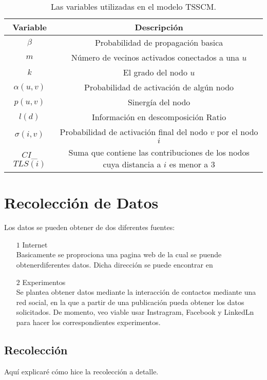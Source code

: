 \documentclass{article}
\begin{document}
\begin{table}[h]
	\begin{center}
		\begin{tabular}{| c | c |}
			\hline
			\textbf{Variable} & \textbf{Descripción} \\ 
			\hline
			$\beta$ & Probabilidad de propagación basica \\
			$m$ & Número de vecinos activados conectados a una $u$\\
			$k$ & El grado del nodo $u$\\
			$\alpha(u,v)$ & Probabilidad de activación de algún nodo\\
			$p(u,v)$ & Sinergía del nodo\\
			$l(d)$ & Información en descomposición Ratio\\
			$\sigma(i,v)$ & Probabilidad de activación final del nodo $v$ por el nodo $i$ \\
			$CI$\_$TLS(i)$ & Suma que contiene las contribuciones de los nodos cuya distancia a $i$ es menor a 3\\
			\hline
		\end{tabular}
		\caption{Las variables utilizadas en el modelo TSSCM.}
		\label{tab:TablaVariables}
	\end{center}
\end{table}

\newpage
\section{Recolección de Datos}
 Los datos se pueden obtener de dos diferentes fuentes: 
 \begin{itemize}
 	\item[$1$] Internet\\ 
 	Basicamente se proprociona una pagina web de la cual se puende obtenerdiferentes datos. Dicha dirección se puede encontrar en \cite{data:01} 
 	\item[$2$] Experimentos\\
 	Se plantea obtener datos mediante la interacción de contactos mediante una red social, en la que a partir de una publicación pueda obtener los datos solicitados. 
 	De momento, veo viable usar Instragram, Facebook y LinkedLn para hacer los correspondientes experimentos.
 \end{itemize}
 \subsection{Recolección}
 	Aquí explicaré cómo hice la recolección a detalle. 
\end{document}
